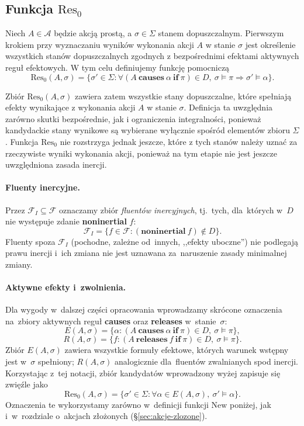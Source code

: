 \documentclass[11pt,a4paper]{article}
\newcommand{\causes}{\textbf{causes}}
\renewcommand{\iff}{\textbf{if}}
\newcommand{\releases}{\textbf{releases}}
\newcommand{\noninertial}{\textbf{noninertial}}
\theoremstyle{definition}
\begin{document}
\subsection{Funkcja \texorpdfstring{$\mathrm{Res}_0$}{Res0}}

Niech $A \in \mathcal{A}$ będzie akcją prostą, a $\sigma \in \Sigma$ stanem dopuszczalnym. Pierwszym krokiem przy wyznaczaniu wyników wykonania akcji $A$ w stanie $\sigma$ jest określenie wszystkich stanów dopuszczalnych zgodnych z bezpośrednimi efektami aktywnych reguł efektowych. W tym celu definiujemy funkcję pomocniczą
\[
\mathrm{Res}_0(A,\sigma)=
\{\sigma' \in \Sigma :
\forall (A\ \textbf{causes}\ \alpha\ \textbf{if}\ \pi)\in D,\ 
\sigma \models \pi \Rightarrow \sigma' \models \alpha\}.
\]

Zbiór $\mathrm{Res}_0(A,\sigma)$ zawiera zatem wszystkie stany dopuszczalne, które spełniają efekty wynikające z wykonania akcji $A$ w stanie $\sigma$. Definicja ta uwzględnia zarówno skutki bezpośrednie, jak i ograniczenia integralności, ponieważ kandydackie stany wynikowe są wybierane wyłącznie spośród elementów zbioru $\Sigma$. Funkcja $\mathrm{Res}_0$ nie rozstrzyga jednak jeszcze, które z tych stanów należy uznać za rzeczywiste wyniki wykonania akcji, ponieważ na tym etapie nie jest jeszcze uwzględniona zasada inercji.

\paragraph{Fluenty inercyjne.}
Przez $\mathcal{F}_I \subseteq \mathcal{F}$ oznaczamy zbiór \emph{fluentów inercyjnych}, tj.\ tych, dla~których w~$D$ nie występuje zdanie \noninertial{} $f$:
\[
  \mathcal{F}_I = \{f \in \mathcal{F} : (\noninertial\ f) \notin D\}.
\]
Fluenty spoza $\mathcal{F}_I$ (pochodne, zależne od~innych, ,,efekty uboczne'') nie podlegają prawu inercji i~ich zmiana nie jest uznawana za~naruszenie zasady minimalnej zmiany.

\paragraph{Aktywne efekty i~zwolnienia.}
Dla wygody w~dalszej części opracowania wprowadzamy skrócone oznaczenia na~zbiory aktywnych reguł \causes{} oraz \releases{} w~stanie~$\sigma$:
\[
  E(A,\sigma)=\{\alpha : (A\ \causes\ \alpha\ \iff\ \pi)\in D,\ \sigma \models \pi\},
\]
\[
  R(A,\sigma)=\{f : (A\ \releases\ f\ \iff\ \pi)\in D,\ \sigma \models \pi\}.
\]
Zbiór $E(A,\sigma)$ zawiera wszystkie formuły efektowe, których warunek wstępny jest w~$\sigma$ spełniony; $R(A,\sigma)$ analogicznie dla~fluentów zwalnianych spod inercji. Korzystając z~tej notacji, zbiór kandydatów wprowadzony wyżej zapisuje się zwięźle jako
\[
  \mathrm{Res}_0(A,\sigma) = \{\sigma' \in \Sigma : \forall \alpha \in E(A,\sigma),\ \sigma' \models \alpha\}.
\]
Oznaczenia te wykorzystamy zarówno w~definicji funkcji $\mathrm{New}$ poniżej, jak i~w~rozdziale o~akcjach złożonych (§\ref{sec:akcje-zlozone}).
\end{document}
